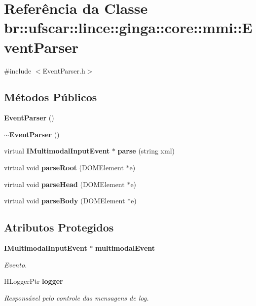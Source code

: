 \section{Referência da Classe br::ufscar::lince::ginga::core::mmi::EventParser}
\label{classbr_1_1ufscar_1_1lince_1_1ginga_1_1core_1_1mmi_1_1EventParser}


{\ttfamily \#include $<$EventParser.h$>$}

\subsection*{Métodos Públicos}
\begin{DoxyCompactItemize}
\item 
{\bf EventParser} ()
\item 
{\bf $\sim$EventParser} ()
\item 
virtual {\bf IMultimodalInputEvent} $\ast$ {\bf parse} (string xml)
\item 
virtual void {\bf parseRoot} (DOMElement $\ast$e)
\item 
virtual void {\bf parseHead} (DOMElement $\ast$e)
\item 
virtual void {\bf parseBody} (DOMElement $\ast$e)
\end{DoxyCompactItemize}
\subsection*{Atributos Protegidos}
\begin{DoxyCompactItemize}
\item 
{\bf IMultimodalInputEvent} $\ast$ {\bf multimodalEvent}\label{classbr_1_1ufscar_1_1lince_1_1ginga_1_1core_1_1mmi_1_1EventParser_a16c3b84cb829121fa0469cb70f7113e9}

\begin{DoxyCompactList}\small\item\em Evento. \item\end{DoxyCompactList}\item 
HLoggerPtr {\bf logger}\label{classbr_1_1ufscar_1_1lince_1_1ginga_1_1core_1_1mmi_1_1EventParser_a00023a052fd6164d261bd5c154e16113}

\begin{DoxyCompactList}\small\item\em Responsável pelo controle das mensagens de log. \item\end{DoxyCompactList}\end{DoxyCompactItemize}


